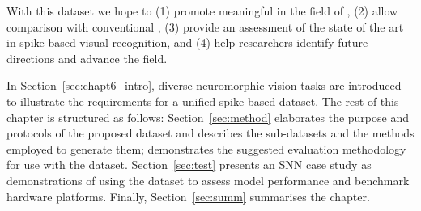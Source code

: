 With this dataset we hope to (1) promote meaningful \DIFdelbegin {}\DIFdelend \DIFaddbegin {}\DIFaddend in the field of \DIFdelbegin {}\DIFdelend \DIFaddbegin {}\DIFaddend , (2) allow comparison with conventional \DIFdelbegin {}\DIFdelend \DIFaddbegin {}\DIFaddend , (3) provide an assessment of the state of the art in spike-based visual recognition, and (4) help researchers identify future directions and advance the field.

In Section~\ref{sec:chapt6_intro}, diverse neuromorphic vision tasks are introduced to illustrate the requirements for a unified spike-based dataset.
The rest of this chapter is structured as follows: Section~\ref{sec:method} elaborates the purpose and protocols of the proposed dataset and describes the sub-datasets and the methods employed to generate them; \DIFdelbegin {}\DIFdelend \DIFaddbegin {}\DIFaddend demonstrates the suggested evaluation methodology for use with the dataset.
Section~\ref{sec:test} presents an SNN case study as demonstrations of using the dataset to assess model performance and benchmark hardware platforms.
Finally, Section~\ref{sec:summ} summarises the chapter.

